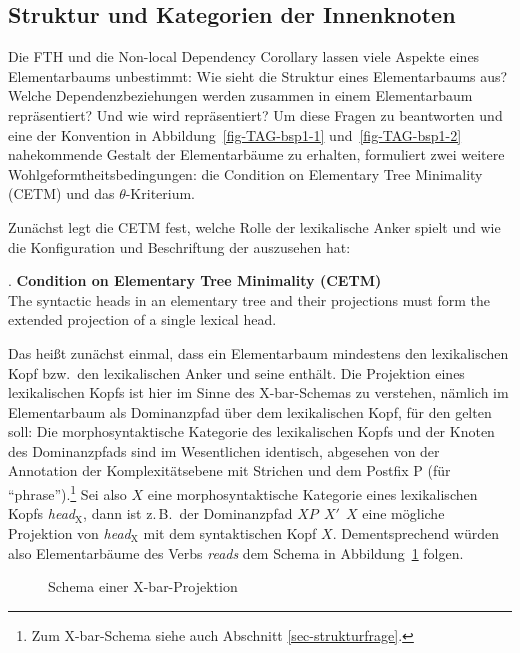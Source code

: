 \subsection{Struktur und Kategorien der Innenknoten}

Die FTH und die Non-local Dependency Corollary lassen viele Aspekte eines Elementarbaums unbestimmt: Wie sieht die Struktur eines Elementarbaums aus? Welche Dependenzbeziehungen werden zusammen in einem Elementarbaum repräsentiert? Und wie wird  repräsentiert?  Um diese Fragen zu beantworten und eine der Konvention in Abbildung~\ref{fig-TAG-bsp1-1} und~\ref{fig-TAG-bsp1-2} nahekommende Gestalt der Elementarbäume zu erhalten, formuliert \cite{Frank:02} zwei weitere Wohlgeformtheitsbedingungen: die Condition on Elementary Tree Minimality (CETM) und das $\theta$-Kriterium. 

Zunächst legt die CETM fest, welche Rolle der lexikalische Anker spielt und wie die Konfiguration und Beschriftung der  auszusehen hat:

\ex. {\bf Condition on Elementary Tree Minimality (CETM)} \label{ex-cetm} \\
The syntactic heads in an elementary tree and their projections must form the extended projection of a single lexical head.
\citep[54]{Frank:02}

Das hei\ss t zunächst einmal, dass ein Elementarbaum mindestens den lexikalischen Kopf bzw.\ den lexikalischen Anker und seine  enthält. Die Projektion eines lexikalischen Kopfs ist hier im Sinne des X-bar-Schemas \citep{Chomsky:70} zu verstehen, nämlich im Elementarbaum als Dominanzpfad über dem lexikalischen Kopf, für den gelten soll: Die morphosyntaktische Kategorie des lexikalischen Kopfs und der Knoten des Dominanzpfads sind im Wesentlichen identisch, abgesehen von der Annotation der Komplexitätsebene mit Strichen und dem Postfix P (für "`phrase"').\footnote{Zum X-bar-Schema siehe auch Abschnitt \ref{sec-strukturfrage}.} Sei also $X$ eine morphosyntaktische Kategorie eines lexikalischen Kopfs {\it head$_{\text{X}}$}, dann ist z.\,B.\ der Dominanzpfad $X\!P ~~ X' ~~ X$ eine mögliche Projektion von {\it head$_{\text{X}}$} mit dem syntaktischen Kopf $X$. Dementsprechend würden also Elementarbäume des Verbs \textit{reads} dem Schema in Abbildung~\ref{fig-cetm-1} folgen.
 
\begin{figure}[p]
\centering
{}
\caption{\label{fig-cetm-1}Schema einer X-bar-Projektion}
\end{figure}

